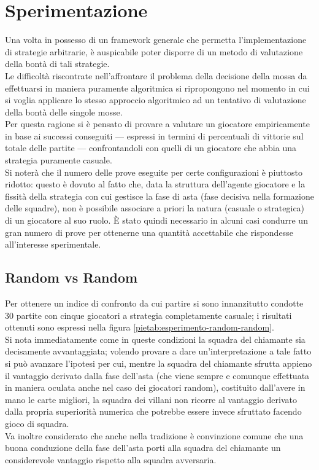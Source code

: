 \chapter*{Sperimentazione}
\graphicspath{{Chapter6/Chapter6Figs/PNG/}{Chapter6/Chapter6Figs/PDF/}{Chapter6/Chapter6Figs/}}

Una volta in possesso di un framework generale che permetta l'implementazione di strategie arbitrarie, è auspicabile poter disporre di un metodo di valutazione della bontà di tali strategie.\\
Le difficoltà riscontrate nell'affrontare il problema della decisione della mossa da effettuarsi in maniera puramente algoritmica si ripropongono nel momento in cui si voglia applicare lo stesso approccio algoritmico ad un tentativo di valutazione della bontà delle singole mosse.\\
Per questa ragione si è pensato di provare a valutare un giocatore empiricamente in base ai successi conseguiti --- espressi in termini di percentuali di vittorie sul totale delle partite ---  confrontandoli con quelli di un giocatore che abbia una strategia puramente casuale.\\
Si noterà che il numero delle prove eseguite per certe configurazioni è piuttosto ridotto: questo è dovuto al fatto che, data la struttura dell'agente giocatore e la fissità della strategia con cui gestisce la fase di asta (fase decisiva nella formazione delle squadre), non è possibile associare a priori la natura (casuale o strategica) di un giocatore al suo ruolo. È stato quindi necessario in alcuni casi condurre un gran numero di prove per ottenerne una quantità accettabile che rispondesse all'interesse sperimentale.


\section{Random vs Random}

Per ottenere un indice di confronto da cui partire si sono innanzitutto condotte 30 partite con cinque giocatori a strategia completamente casuale; i risultati ottenuti sono espressi nella figura \ref{pietab:esperimento-random-random}.\\
Si nota immediatamente come in queste condizioni la squadra del chiamante sia decisamente avvantaggiata; volendo provare a dare un'interpretazione a tale fatto si può avanzare l'ipotesi per cui, mentre la squadra del chiamante sfrutta appieno il vantaggio derivato dalla fase dell'asta (che viene sempre e comunque effettuata in maniera oculata anche nel caso dei giocatori random), costituito dall'avere in mano le carte migliori, la squadra dei villani non ricorre al vantaggio derivato dalla propria superiorità numerica che potrebbe essere invece sfruttato facendo gioco di squadra.\\
Va inoltre considerato che anche nella tradizione è convinzione comune che una buona conduzione della fase dell'asta porti alla squadra del chiamante un considerevole vantaggio rispetto alla squadra avversaria.

